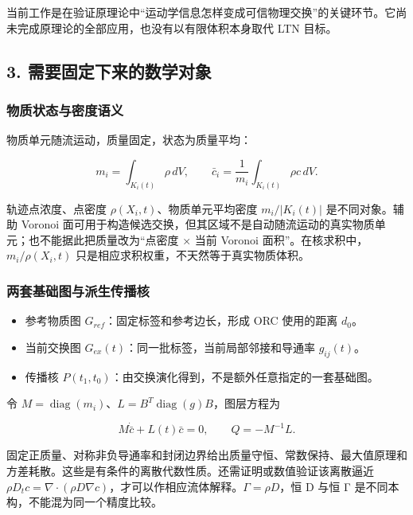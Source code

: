 \documentclass[
  10pt,
  a4paper,
]{article}
\providecommand{\tightlist}{%
  \setlength{\itemsep}{0pt}\setlength{\parskip}{0pt}}
\begin{document}
当前工作是在验证原理论中``运动学信息怎样变成可信物理交换''的关键环节。它尚未完成原理论的全部应用，也没有以有限体积本身取代
LTN 目标。

\subsection{3.
需要固定下来的数学对象}\label{ux9700ux8981ux56faux5b9aux4e0bux6765ux7684ux6570ux5b66ux5bf9ux8c61}

\subsubsection{物质状态与密度语义}\label{ux7269ux8d28ux72b6ux6001ux4e0eux5bc6ux5ea6ux8bedux4e49}

物质单元随流运动，质量固定，状态为质量平均：

\[
m_i=\int_{K_i(t)}\rho\,dV,\qquad
\bar c_i=\frac{1}{m_i}\int_{K_i(t)}\rho c\,dV.
\]

轨迹点浓度、点密度 \(\rho(X_i,t)\)、物质单元平均密度 \(m_i/|K_i(t)|\)
是不同对象。辅助 Voronoi
面可用于构造候选交换，但其区域不是自动随流运动的真实物质单元；也不能据此把质量改为``点密度
× 当前 Voronoi 面积''。在核求积中，\(m_i/\rho(X_i,t)\)
只是相应求积权重，不天然等于真实物质体积。

\subsubsection{两套基础图与派生传播核}\label{ux4e24ux5957ux57faux7840ux56feux4e0eux6d3eux751fux4f20ux64adux6838}

\begin{itemize}
\tightlist
\item
  参考物质图 \(G_{ref}\)：固定标签和参考边长，形成 ORC 使用的距离
  \(d_0\)。
\item
  当前交换图 \(G_{ex}(t)\)：同一批标签，当前局部邻接和导通率
  \(g_{ij}(t)\)。
\item
  传播核 \(P(t_1,t_0)\)：由交换演化得到，不是额外任意指定的一套基础图。
\end{itemize}

令
\(M=\operatorname{diag}(m_i)\)、\(L=B^T\operatorname{diag}(g)B\)，图层方程为

\[
M\dot{\bar c}+L(t)\bar c=0,\qquad Q=-M^{-1}L.
\]

固定正质量、对称非负导通率和封闭边界给出质量守恒、常数保持、最大值原理和方差耗散。这些是有条件的离散代数性质。还需证明或数值验证该离散逼近
\(\rho D_t c=\nabla\cdot(\rho D\nabla c)\)，才可以作相应流体解释。\(\Gamma=\rho D\)，恒
D 与恒 Γ 是不同本构，不能混为同一个精度比较。
\end{document}
